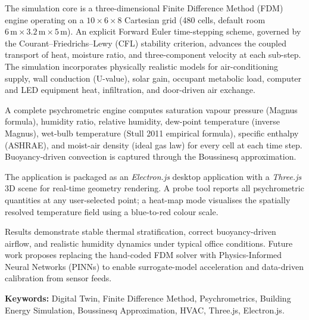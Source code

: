 \documentclass[12pt,a4paper]{report}
\makeatletter
\renewcommand\listoffigures{%
  \section*{\listfigurename}%
  \@mkboth{\MakeUppercase\listfigurename}{\MakeUppercase\listfigurename}%
  \@starttoc{lof}%
}
\renewcommand\listoftables{%
  \section*{\listtablename}%
  \@mkboth{\MakeUppercase\listtablename}{\MakeUppercase\listtablename}%
  \@starttoc{lot}%
}
\makeatother
\begin{document}
The simulation core is a three-dimensional Finite Difference Method (FDM) engine operating on a $10 \times 6 \times 8$ Cartesian grid (480 cells, default room $6\,\text{m} \times 3.2\,\text{m} \times 5\,\text{m}$). An explicit Forward Euler time-stepping scheme, governed by the Courant--Friedrichs--Lewy (CFL) stability criterion, advances the coupled transport of heat, moisture ratio, and three-component velocity at each sub-step. The simulation incorporates physically realistic models for air-conditioning supply, wall conduction (U-value), solar gain, occupant metabolic load, computer and LED equipment heat, infiltration, and door-driven air exchange.

A complete psychrometric engine computes saturation vapour pressure (Magnus formula), humidity ratio, relative humidity, dew-point temperature (inverse Magnus), wet-bulb temperature (Stull 2011 empirical formula), specific enthalpy (ASHRAE), and moist-air density (ideal gas law) for every cell at each time step. Buoyancy-driven convection is captured through the Boussinesq approximation.

The application is packaged as an \textit{Electron.js} desktop application with a \textit{Three.js} 3D scene for real-time geometry rendering. A probe tool reports all psychrometric quantities at any user-selected point; a heat-map mode visualises the spatially resolved temperature field using a blue-to-red colour scale.

Results demonstrate stable thermal stratification, correct buoyancy-driven airflow, and realistic humidity dynamics under typical office conditions. Future work proposes replacing the hand-coded FDM solver with Physics-Informed Neural Networks (PINNs) to enable surrogate-model acceleration and data-driven calibration from sensor feeds.

\vspace{1cm}
\noindent\textbf{Keywords:} Digital Twin, Finite Difference Method, Psychrometrics, Building Energy Simulation, Boussinesq Approximation, HVAC, Three.js, Electron.js.

\newpage

\tableofcontents
\newpage
\listoffigures
{}
\vspace{1.5em}
\listoftables
{}

\newpage
\end{document}
